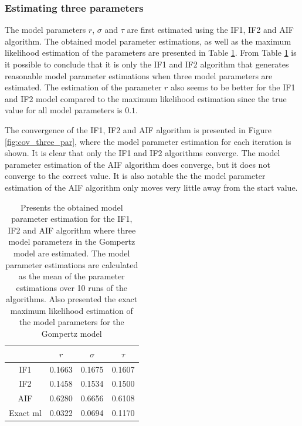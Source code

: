 \documentclass[twoside,openright]{report}
\begin{document}
\subsubsection{Estimating three parameters}

The model parameters $r$, $\sigma$ and $\tau$ are first estimated using the IF1, IF2 and AIF algorithm. The obtained model parameter estimations, as well as the maximum likelihood estimation of the parameters are presented in Table \ref{tab:par_Gompertz}. From Table \ref{tab:par_Gompertz} is it possible to conclude that it is only the IF1 and IF2 algorithm that generates reasonable model parameter estimations when three model parameters are estimated. The estimation of the parameter $r$ also seems to be better for the IF1 and IF2 model compared to the maximum likelihood estimation since the true value for all model parameters is $0.1$. 

The convergence of the IF1, IF2 and AIF algorithm is presented in Figure \ref{fig:cov_three_par}, where the model parameter estimation for each iteration is shown. It is clear that only the IF1 and IF2 algorithms converge. The model parameter estimation of the AIF algorithm does converge, but it does not converge to the correct value. It is also notable the the model parameter estimation of the AIF algorithm only moves very little away from the start value.     

\begin{table}[h]
    \centering
    \caption{Presents the obtained model parameter estimation for the IF1, IF2 and AIF algorithm where three model parameters in the Gompertz model are estimated. The model parameter estimations are calculated as the mean of the parameter estimations over 10 runs of the algorithms.  Also presented the exact  maximum likelihood estimation of the model parameters for the Gompertz model \cite{king2015statistical}  }
    \begin{tabular}{ c | c c  c }
    \toprule
        & $r$ & $\sigma$ & $\tau$ \\ 
    \midrule
    IF1  & 0.1663  &  0.1675 &    0.1607 \\ 
    IF2  & 0.1458  &  0.1534 &    0.1500 \\ 
    AIF  & 0.6280  &  0.6656 &    0.6108 \\
    Exact ml  \cite{king2015statistical} & 0.0322 & 0.0694 & 0.1170 \\ 
    \bottomrule
    \end{tabular}
    \label{tab:par_Gompertz}
\end{table}
\end{document}
